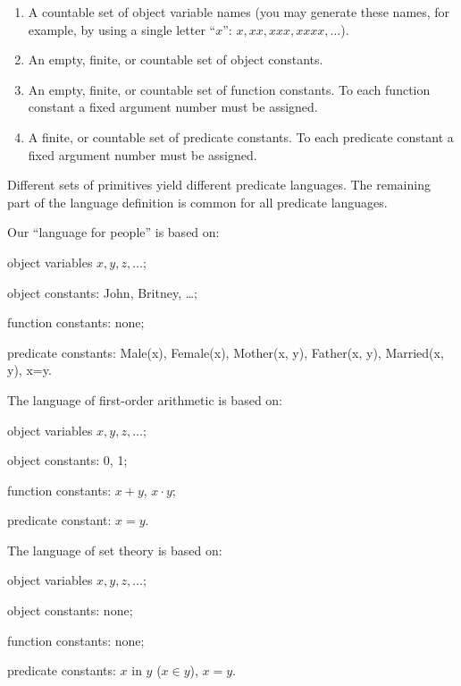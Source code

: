 \begin{enumerate}
    \item A countable set of object variable names (you may generate these names, for example, by using a single letter ``\(x\)'': \(x, xx, xxx, xxxx, \ldots\)).
    \item An empty, finite, or countable set of object constants.
    \item An empty, finite, or countable set of function constants.
    To each function constant a fixed argument number must be assigned.
    \item A finite, or countable set of predicate constants.
    To each predicate constant a fixed argument number must be assigned.
\end{enumerate}

Different sets of primitives yield different predicate languages. The remaining part of the language definition is common for all predicate languages.

\begin{example}
Our ``language for people'' is based on:
\begin{inparaenum}[(a)]
    \item object variables \(x, y, z, \ldots\);
    \item object constants: John, Britney, \ldots;
    \item function constants: none;
    \item predicate constants: Male(x), Female(x), Mother(x, y), Father(x, y), Married(x, y), x=y.
\end{inparaenum}
\end{example}

\begin{example}
The language of first-order arithmetic is based on: 

\begin{inparaenum}[(a)]
    \item object variables \(x, y, z, \ldots\);
    \item object constants: 0, 1;
    \item function constants: \(x+y\), \(x\cdot y\);
    \item predicate constant: \(x=y\).
\end{inparaenum}
\end{example}

\begin{example}
The language of set theory is based on:

\begin{inparaenum}[(a)]
    \item object variables \(x, y, z, \ldots\);
    \item object constants: none;
    \item function constants: none;
    \item predicate constants: \(x\) in \(y\) (\(x\in y\)), \(x=y\).
\end{inparaenum}
\end{example}

